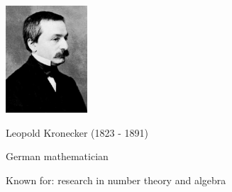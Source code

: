 \begin{frame}
\hfil\hfil \includegraphics[height=4cm]{../../modules/history/pictures/kronecker.jpg}

\hfil\hfil Leopold Kronecker (1823 - 1891)

\hfil\hfil German mathematician

\hfil\hfil Known for: research in number theory and algebra


\end{frame}